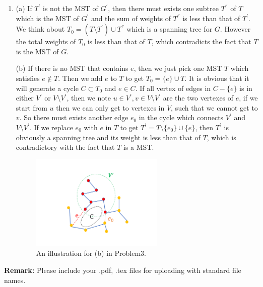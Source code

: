 \documentclass[12pt,a4paper]{article}
\makeatletter
\newtheorem*{solution}{Solution}
\theoremstyle{definition}
\renewenvironment{solution}[1][Solution] {\par\pushQED{\qed}\normalfont\topsep6\p@\@plus6\p@\relax\trivlist\item[\hskip\labelsep\bfseries#1\@addpunct{.}]\ignorespaces}{\popQED\endtrivlist\@endpefalse} \makeatother
\makeatother
\begin{document}
\begin{enumerate}
\begin{solution}
(a) If $T^{'}$ is not the MST of $G^{'}$, then there must exists one subtree $T^{''}$ of $T$ which is the 
MST of $G^{'}$ and the sum of weights of $T^{''}$ is less than that of $T^{'}$. We think about $T_0 = (T\setminus T^{'})\cup T^{''}$ which is a spanning tree 
 for $G$. However the total weights of $T_0$ is less than that of $T$, which contradicts the fact that $T$ is the MST of $G$.

(b) If there is no MST that contains $e$, then we just pick one MST $T$ which satisfies $e \notin T$. Then we add $e$ to $T$ to get $T_0 = \{e\} \cup T$. 
It is obvious that it will generate a cycle $C \subset T_0$ and $e \in C$. If all vertex of edges in $C - \{e\}$ is in either $V^{'}$ or $V \setminus V^{'}$, then we note $u\in V^{'},v \in V \setminus V^{'}$
are the two vertexes of $e$, if we start from $u$ then we can only get to vertexes in $V$, such that we cannot get to $v$. So there must exists another edge $e_0$ in 
the cycle which connects $V^{'}$ and $V\setminus V^{'}$. If we replace $e_0$ with $e$ in $T$ to get $T^{'} = T \setminus \{e_0\} \cup \{e\} $, then $T^{'}$ is 
obviously a spanning tree and its weight is less than that of $T$, which is contradictory with the fact that $T$ is a MST.

\begin{figure}[!htbp]
	\centering
	\includegraphics[width=0.6\textwidth]{32.pdf}
	\caption{An illustration for (b) in Problem3.}
	\label{Fig-MultiStack}
	\end{figure}


\end{solution}

\end{enumerate}

\textbf{Remark:} Please include your .pdf, .tex files for uploading with standard file names.


\end{document}
